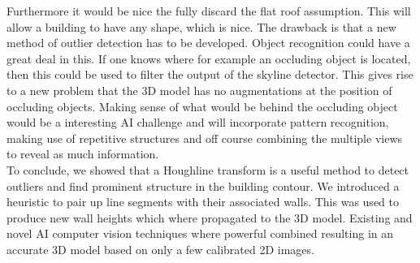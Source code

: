 \documentclass[10pt]{article}
\begin{document}
Furthermore it would be nice the fully discard the flat roof assumption. This will allow a building to have any shape, which is nice. The drawback is that a new method of outlier detection has to be developed. Object recognition could have a great deal in this. If one knows where for example an occluding object is located, then this could be used to filter the output of the skyline detector. This gives rise to a new problem that the 3D model has no augmentations at the position of occluding objects. Making sense of what would be behind the occluding object would be a interesting AI challenge and will incorporate pattern recognition, making use of repetitive structures and off course combining the multiple views to reveal as much information.\\

To conclude, we showed that a Houghline transform is a useful method to detect outliers and find prominent structure in the building contour. We introduced a heuristic to pair up line segments with their associated walls. This was used to produce new wall heights which where propagated to the 3D model.
Existing and novel AI computer vision techniques where powerful combined resulting in an accurate 3D model based on only a few calibrated 2D images. 


\end{document}
